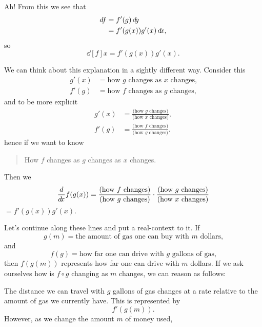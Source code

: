 \documentclass{ximera}
\begin{document}
\begin{theorem}
\begin{explanation}
\begin{image}
  \end{image}
  Ah! From this we see that
  \begin{align*}
    \mathop{}\!d\! f &= f'(g) \mathop{}\!d\! g\\
    &= f'(g(x)) g'(x) \mathop{}\!d\! x,
  \end{align*}
  so
  \[
  \dd[f]{x} = f'(g(x))g'(x).
  \]
\end{explanation}
\end{theorem}

We can think about this explanation in a sightly different way.
Consider this
\begin{align*}
g'(x) &= \text{how $g$ changes as $x$ changes,}\\
f'(g) &= \text{how $f$ changes as $g$ changes,}
\end{align*}
and to be more explicit
\begin{align*}
g'(x) &= \frac{\text{(how $g$ changes)}}{\text{(how $x$ changes)}},\\
f'(g) &= \frac{\text{(how $f$ changes)}}{\text{(how $g$ changes)}}.
\end{align*}
hence if we want to know
\begin{quote}
  How $f$ changes as $g$ changes as $x$ changes.
\end{quote}
Then we 
\[
\frac{d}{\mathop{}\!d\! x} f(g(x)) = \frac{\text{(how $f$ changes)}}{\text{(how $g$ changes)}}\cdot\frac{\text{(how $g$ changes)}}{\text{(how $x$ changes)}}
\]
$= f'(g(x)) g'(x).$



Let's continue along these lines and put a real-context to it. If 
\[
g(m) = \text{the amount of gas one can buy with $m$ dollars,}
\]
and
\[
f(g) = \text{how far one can drive with $g$ gallons of gas,}
\]
then $f(g(m))$ represents how far one can drive with $m$ dollars. If we
ask ourselves how is $f\circ g$ changing as $m$ changes, we can reason
as follows:

The distance we can travel with $g$ gallons of gas changes at a rate
relative to the amount of gas we currently have. This is represented by
\[
f'(g(m)).
\]
However, as we change the amount $m$ of money used, 
\end{document}
